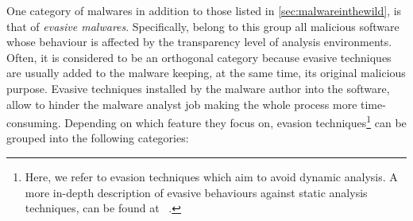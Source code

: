 \documentclass[LaM,binding=0.6cm]{sapthesis}
\begin{document}
One category of malwares in addition to those listed in \autoref{sec:malwareinthewild}, is that of \textit{evasive malwares}. Specifically, belong to this group all malicious software whose behaviour is affected by the transparency level of analysis environments. Often, it is considered to be an orthogonal category because evasive techniques are usually added to the malware keeping, at the same time, its original malicious purpose. Evasive techniques installed by the malware author into the software, allow to hinder the malware analyst job making the whole process more time-consuming.
\newpage
Depending on which feature they focus on, evasion techniques\footnote{Here, we refer to evasion techniques which aim to avoid dynamic analysis. A more in-depth description of evasive behaviours against static analysis techniques, can be found at ~\cite{moser2007limits}.} can be grouped into the following categories:
\end{document}

